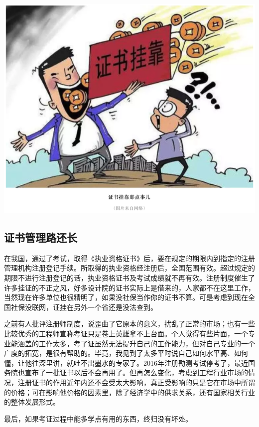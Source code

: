 \documentclass[]{book}
\begin{document}
\includegraphics[width=8.33in]{images/kaozheng5}

\hypertarget{ux8bc1ux4e66ux7ba1ux7406ux8defux8fd8ux957f}{%
\subsection{证书管理路还长}\label{ux8bc1ux4e66ux7ba1ux7406ux8defux8fd8ux957f}}

在我国，通过了考试，取得《执业资格证书》后，要在规定的期限内到指定的注册管理机构注册登记手续。所取得的执业资格经注册后，全国范围有效。超过规定的期限不进行注册登记的话，执业资格证书及考试成绩就不再有效。注册制度催生了许多挂证的不正之风，好多设计院的证书实际上是借来的，人家都不在这里工作，当然现在许多单位也很精明了，如果没社保当作你的证书不算。可是考虑到现在全国社保没联网，证挂在另外一个省还是没法查到。

之前有人批评注册师制度，说歪曲了它原本的意义，扰乱了正常的市场；也有一些比较优秀的工程师宣称考证只是卷上英雄拿不上台面。个人觉得有些片面，一个专业能涵盖的工作太多，考了证虽然无法提升自己的工作能力，但对自己专业的一个广度的拓宽，是很有帮助的。毕竟，我见到了太多平时说自己如何水平高、如何懂，让他往深里讲，就吐不出墨水的专家了。2016年注册勘测考试停考了，最近国务院也宣布了一批证书以后不会再用了。但再怎么变化，考虑到工程行业市场的情况，注册证书的作用近年内还不会受太大影响，真正受影响的只是它在市场中所谓的价格；可在影响他价格的因素里，除了经济学中的供求关系，还有国家相关行业的整体发展形式。

最后，如果考证过程中能多学点有用的东西，终归没有坏处。
\end{document}
